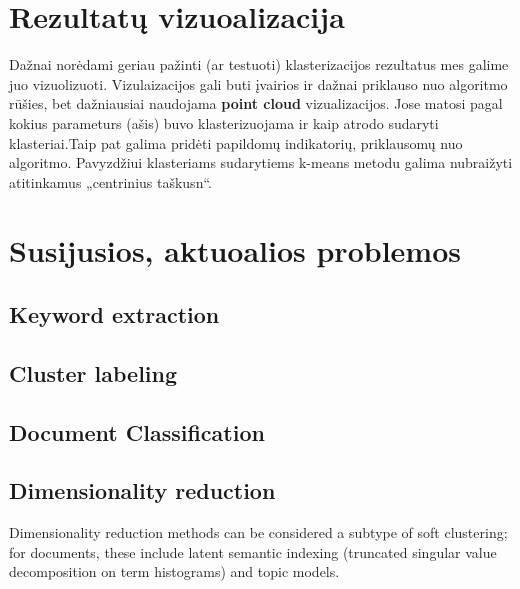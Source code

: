 \documentclass{VUMIFInfKursinis}
\begin{document}
\section{Rezultatų vizuoalizacija}
Dažnai norėdami geriau pažinti (ar testuoti) klasterizacijos rezultatus mes galime juo vizuolizuoti. Vizulaizacijos gali buti įvairios ir dažnai priklauso nuo algoritmo rūšies, bet dažniausiai naudojama \textbf{point cloud} vizualizacijos. Jose matosi pagal kokius parameturs (ašis) buvo klasterizuojama ir kaip atrodo sudaryti klasteriai.Taip pat galima pridėti papildomų indikatorių, priklausomų nuo algoritmo. Pavyzdžiui klasteriams sudarytiems k-means metodu galima nubraižyti atitinkamus „centrinius taškusn“.

\section{Susijusios, aktuoalios problemos}
\subsection{Keyword extraction}
\subsection{Cluster labeling}
\subsection{Document Classification}
\subsection{Dimensionality reduction}
Dimensionality reduction methods can be considered a subtype of soft clustering; for documents, these include latent semantic indexing (truncated singular value decomposition on term histograms) and topic models.


\printbibliography[heading=bibintoc] %

\appendix  %
\end{document}
